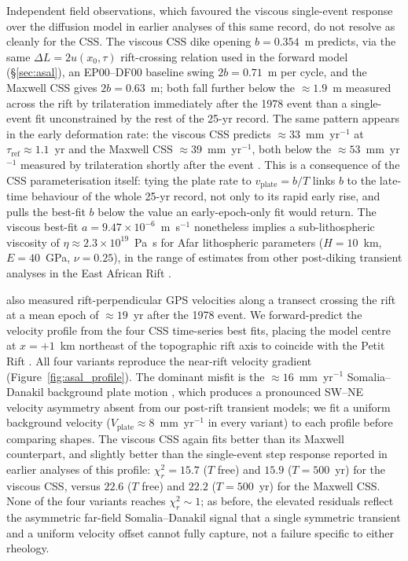\documentclass[extra]{gji}
\begin{document}
Independent field observations, which favoured the viscous single-event
response over the \citet{foulger1992post} diffusion model in earlier
analyses of this same record, do not resolve as cleanly for the CSS.  The
viscous CSS dike opening $b = 0.354$~m predicts, via the same $\Delta
L = 2u(x_0,\tau)$ rift-crossing relation used in the forward model
(\S\ref{sec:asal}), an EP00--DF00 baseline swing $2b = 0.71$~m per
cycle, and the Maxwell CSS gives $2b = 0.63$~m; both fall further
below the $\approx1.9$~m measured across the rift by trilateration
immediately after the 1978 event \citep{ruegg1979geodetic} than a
single-event fit unconstrained by the rest of the 25-yr record.  The same
pattern appears in the early deformation rate: the viscous CSS predicts
$\approx33$~mm~yr$^{-1}$ at $\tau_{\mathrm{ref}} \approx 1.1$~yr and the
Maxwell CSS $\approx39$~mm~yr$^{-1}$, both below the $\approx53$~mm~yr$^{-1}$
measured by trilateration shortly after the event \citep{ruegg1987deformation}.
This is a consequence of the CSS parameterisation itself: tying the
plate rate to $v_{\text{plate}} = b/T$ links $b$ to the late-time behaviour
of the whole 25-yr record, not only to its rapid early rise, and pulls the
best-fit $b$ below the value an early-epoch-only fit would return.  The
viscous best-fit $a = 9.47\times10^{-6}$~m~s$^{-1}$ nonetheless implies a
sub-lithospheric viscosity of $\eta \approx 2.3\times10^{19}$~Pa~s for Afar
lithospheric parameters ($H = 10$~km, $E = 40$~GPa, $\nu = 0.25$), in the
range of estimates from other post-diking transient analyses in the East
African Rift \citep{nooner2009post}.

\citet{vigny2007twenty} also measured rift-perpendicular GPS velocities along a
transect crossing the rift at a mean epoch of $\approx19$~yr after the 1978
event.  We forward-predict the velocity profile from the four CSS
time-series best fits, placing the model centre at $x = +1$~km northeast
of the topographic rift axis to coincide with the Petit Rift
\citep{vigny2007twenty}.  All four variants reproduce the near-rift
velocity gradient (Figure~\ref{fig:asal_profile}).  The dominant misfit is
the $\approx16$~mm~yr$^{-1}$ Somalia--Danakil background plate motion
\citep{saria2014present,stamps2021redefining}, which produces a pronounced
SW--NE velocity asymmetry absent from our post-rift transient models; we
fit a uniform background velocity ($V_{\mathrm{plate}} \approx 8$~mm~yr$^{-1}$
in every variant) to each profile before comparing shapes.  The viscous
CSS again fits better than its Maxwell counterpart, and slightly better
than the single-event step response reported in earlier analyses of this
profile: $\chi^2_r = 15.7$ ($T$ free) and $15.9$ ($T=500$~yr) for the
viscous CSS, versus $22.6$ ($T$ free) and $22.2$ ($T=500$~yr) for the
Maxwell CSS.  None of the four variants reaches $\chi^2_r \sim 1$; as
before, the elevated residuals reflect the asymmetric far-field
Somalia--Danakil signal that a single symmetric transient and a uniform
velocity offset cannot fully capture, not a failure specific to either
rheology.
\end{document}
